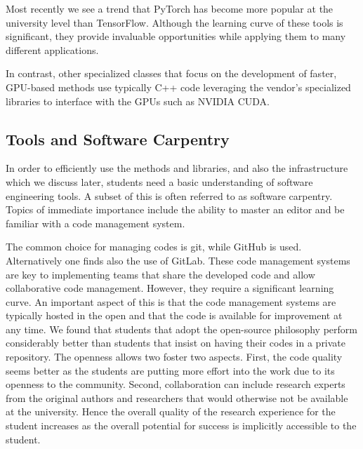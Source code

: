 \documentclass[utf8]{FrontiersinVancouver} %
\begin{document}
Most recently we see a trend that PyTorch has become more popular at
the university level than TensorFlow.  Although the learning curve of
these tools is significant, they provide invaluable opportunities
while applying them to many different applications.

In contrast, other specialized classes that focus on the development
of faster, GPU-based methods use typically C++ code leveraging the
vendor's specialized libraries to interface with the GPUs such as
NVIDIA CUDA.

\subsection{Tools and Software Carpentry}\label{sec:tools}

In order to efficiently use the methods and libraries, and also the
infrastructure which we discuss later, students need a basic
understanding of software engineering tools. A subset of this is often
referred to as software carpentry. Topics of immediate importance
include the ability to master an editor and be familiar with a code
management system.

The common choice for managing codes is git, while GitHub is used.
Alternatively one finds also the use of GitLab.  These code management
systems are key to implementing teams that share the developed code
and allow collaborative code management.  However, they require a
significant learning curve. An important aspect of this is that the
code management systems are typically hosted in the open and that the
code is available for improvement at any time. We found that students
that adopt the open-source philosophy perform considerably better than
students that insist on having their codes in a private
repository. The openness allows two foster two aspects. First, the
code quality seems better as the students are putting more effort into
the work due to its openness to the community. Second, collaboration
can include research experts from the original authors and researchers
that would otherwise not be available at the university. Hence the
overall quality of the research experience for the student increases
as the overall potential for success is implicitly accessible to the
student.
\end{document}
